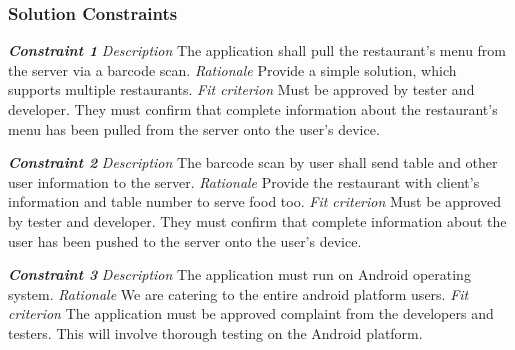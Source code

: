 \documentclass[12pt, titlepage]{article}
\begin{document}
\subsubsection{Solution Constraints}
\textbf{\textit{Constraint 1}}
\newline
\textit{Description}\newline
The application shall pull the restaurant’s menu from the server via a barcode scan.\newline\newline
\textit{Rationale}\newline
Provide a simple solution, which supports multiple restaurants. \newline\newline
\textit{Fit criterion}\newline
Must be approved by tester and developer. They must confirm that complete information about the restaurant’s menu has been pulled from the server onto the user’s device.\newline\newline

\noindent\textbf{\textit{Constraint 2}}
\newline
\textit{Description}\newline
The barcode scan by user shall send table and other user information to the server.\newline\newline
\textit{Rationale}\newline
Provide the restaurant with client’s information and table number to serve food too. \newline\newline
\textit{Fit criterion}\newline
Must be approved by tester and developer. They must confirm that complete information about the user has been pushed to the server onto the user’s device.\newline\newline

\noindent\textbf{\textit{Constraint 3}}
\newline
\textit{Description}\newline
The application must run on Android operating system. \newline\newline
\textit{Rationale}\newline
We are catering to the entire android platform users. \newline\newline
\textit{Fit criterion}\newline
The application must be approved complaint from the developers and testers. This will involve thorough testing on the Android platform.\newline\newline
\end{document}
